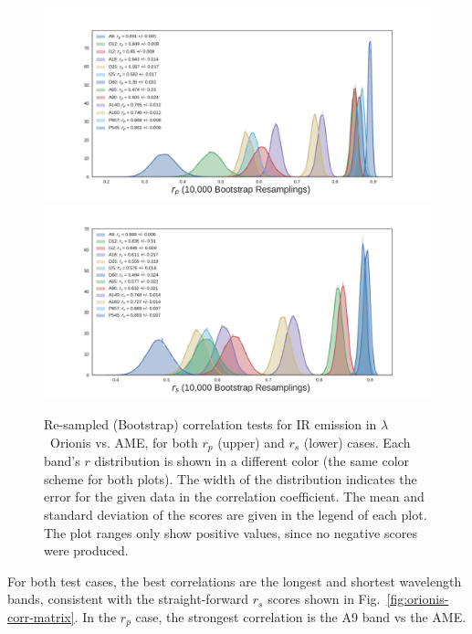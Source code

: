            \begin{figure}
              \includegraphics[width=\textwidth,trim={3cm 0.25cm 2.5cm 1cm},clip]{../Plots/ch_lori/bootstrap_vs_AME_pearson_i10000.pdf}
              \includegraphics[width=\textwidth,trim={3cm 0.25cm 2.5cm 1cm},clip]{../Plots/ch_lori/bootstrap_vs_AME_spearman_i10000.pdf}
              \centering
              \caption{Re-sampled (Bootstrap) correlation tests for IR emission in $\lambda$~Orionis vs. AME, for both $r_{p}$ (upper) and $r_{s}$ (lower) cases. Each band's $r$ distribution is shown in a different color (the same color scheme for both plots). The width of the distribution indicates the error for the given data in the correlation coefficient. The mean and standard deviation of the scores are given in the legend of each plot. The plot ranges only show positive values, since no negative scores were produced. }
              \label{fig:bootstrap_vs_AME}
            \end{figure}
        For both test cases, the best correlations are the longest and shortest wavelength bands, consistent with the straight-forward $r_{s}$ scores shown in Fig.~\ref{fig:orionis-corr-matrix}. In the $r_{p}$ case, the strongest correlation is the A9 band vs the AME.
